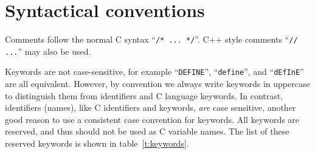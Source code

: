 \section{Syntactical conventions}
\label{s:syntax}

Comments follow the normal C syntax ``\verb+/* ... */+''. C++ style
comments ``\verb+// ...+'' may also be used.


Keywords are not case-sensitive, for example ``\verb+DEFINE+'',
``\verb+define+'', and ``\verb+dEfInE+'' are all equivalent. However, by
convention we always write keywords in uppercase to distinguish them
from identifiers and C language keywords. In contrast, \MCX
identifiers (names), like C identifiers and keywords, \emph{are} case
sensitive, another good reason to use a consistent case convention for
keywords. All \MCX keywords are reserved, and thus should not be used
as C variable names. The list of these reserved keywords is shown in table~\ref{t:keywords}. 

